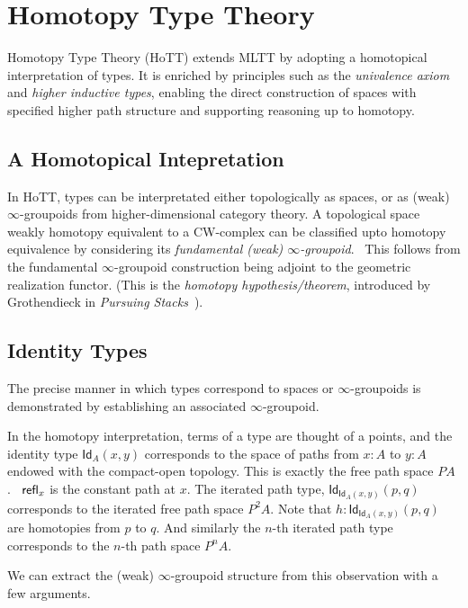 \section{Homotopy Type Theory}

Homotopy Type Theory (HoTT) extends MLTT by adopting a homotopical interpretation
of types.
It is enriched by principles such as the \emph{univalence axiom} and \emph{higher inductive types}, 
enabling the direct construction of spaces with specified higher path structure and supporting reasoning up to homotopy.

\subsection{A Homotopical Intepretation}
In HoTT, types can be interpretated either topologically as spaces, 
or as (weak) $\infty$-groupoids from higher-dimensional category theory.
A topological space weakly homotopy equivalent to a CW-complex can be classified upto homotopy equivalence by considering its \textit{fundamental
(weak) $\infty$-groupoid}.~\cite{lurie, quillen2006homotopical} This follows from the fundamental $\infty$-groupoid construction being adjoint 
to the geometric realization functor. (This is the \textit{homotopy hypothesis/theorem}, introduced by Grothendieck in \emph{Pursuing Stacks}~\cite{grothstacks}).

\subsection{Identity Types}
The precise manner in which types correspond to spaces or $\infty$-groupoids is demonstrated by
establishing an associated $\infty$-groupoid.

In the homotopy interpretation, terms of a type are thought of a points, and the identity type $\mathsf{Id}_A(x,y)$ corresponds to the space of 
paths from $x : A$ to $y : A$ endowed with the compact-open topology. This is exactly the free path space $PA$.~\cite{tom2008algebraic} $\mathsf{refl}_x$ is the
constant path at $x$.
The iterated path type, $\mathsf{Id}_{\mathsf{Id}_A(x,y)}(p,q)$ corresponds to the iterated free path space $P^2 A$.
Note that $h : \mathsf{Id}_{\mathsf{Id}_A(x,y)}(p,q)$ are homotopies from $p$ to $q$.
And similarly the $n$-th iterated path type corresponds to the $n$-th path space $P^n A$. 

We can extract the (weak) $\infty$-groupoid structure from this observation with a few arguments.

